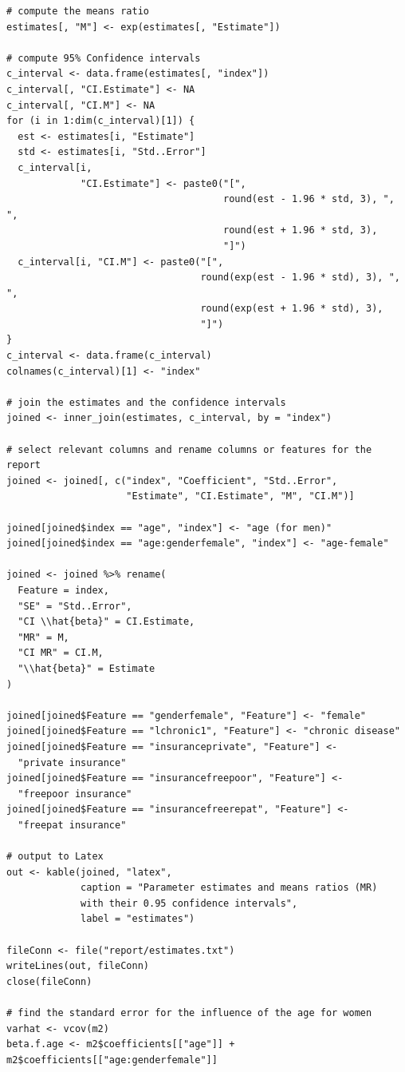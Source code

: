 \documentclass[a4paper,11pt]{article}
\begin{document}
\begin{verbatim}
# compute the means ratio
estimates[, "M"] <- exp(estimates[, "Estimate"])

# compute 95% Confidence intervals
c_interval <- data.frame(estimates[, "index"])
c_interval[, "CI.Estimate"] <- NA
c_interval[, "CI.M"] <- NA
for (i in 1:dim(c_interval)[1]) {
  est <- estimates[i, "Estimate"]
  std <- estimates[i, "Std..Error"]
  c_interval[i,
             "CI.Estimate"] <- paste0("[",
                                      round(est - 1.96 * std, 3), ", ",
                                      round(est + 1.96 * std, 3),
                                      "]")
  c_interval[i, "CI.M"] <- paste0("[",
                                  round(exp(est - 1.96 * std), 3), ", ",
                                  round(exp(est + 1.96 * std), 3),
                                  "]")
}
c_interval <- data.frame(c_interval)
colnames(c_interval)[1] <- "index"

# join the estimates and the confidence intervals
joined <- inner_join(estimates, c_interval, by = "index")

# select relevant columns and rename columns or features for the report
joined <- joined[, c("index", "Coefficient", "Std..Error",
                     "Estimate", "CI.Estimate", "M", "CI.M")]

joined[joined$index == "age", "index"] <- "age (for men)"
joined[joined$index == "age:genderfemale", "index"] <- "age-female"

joined <- joined %>% rename(
  Feature = index,
  "SE" = "Std..Error",
  "CI \\hat{beta}" = CI.Estimate,
  "MR" = M,
  "CI MR" = CI.M,
  "\\hat{beta}" = Estimate
)

joined[joined$Feature == "genderfemale", "Feature"] <- "female"
joined[joined$Feature == "lchronic1", "Feature"] <- "chronic disease"
joined[joined$Feature == "insuranceprivate", "Feature"] <-
  "private insurance"
joined[joined$Feature == "insurancefreepoor", "Feature"] <-
  "freepoor insurance"
joined[joined$Feature == "insurancefreerepat", "Feature"] <-
  "freepat insurance"

# output to Latex
out <- kable(joined, "latex",
             caption = "Parameter estimates and means ratios (MR)
             with their 0.95 confidence intervals",
             label = "estimates")

fileConn <- file("report/estimates.txt")
writeLines(out, fileConn)
close(fileConn)

# find the standard error for the influence of the age for women
varhat <- vcov(m2)
beta.f.age <- m2$coefficients[["age"]] + m2$coefficients[["age:genderfemale"]]


\end{verbatim}
\end{document}
